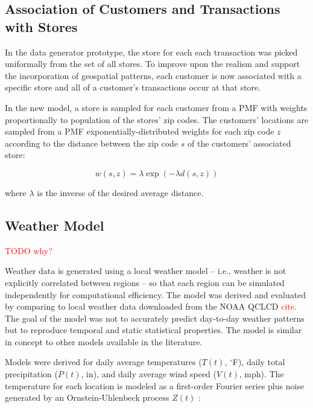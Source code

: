 \documentclass[conference]{IEEEtran}
\begin{document}

\subsection{Association of Customers and Transactions with Stores}
In the data generator prototype, the store for each each transaction was picked uniformally from the set of all stores.  To improve upon the realism and support the incorporation of geospatial patterns, each customer is now associated with a specific store and all of a customer's transactions occur at that store.

In the new model, a store is sampled for each customer from a PMF with weights proportionally to population of the stores' zip codes.  The customers' locations are sampled from a PMF exponentially-distributed weights for each zip code $z$ according to the distance between the zip code $s$ of the customers' associated store:

\begin{equation}
w(s, z) = \lambda \exp(-\lambda d(s, z))
\end{equation}

where $\lambda$ is the inverse of the desired average distance.

\subsection{Weather Model}

\textcolor{red}{TODO why?}

Weather data is generated using a local weather model -- i.e., weather is not explicitly correlated between regions -- so that each region can be simulated independently for computational efficiency.  The model was derived and evaluated by comparing to local weather data downloaded from the NOAA QCLCD \textcolor{red}{cite}.  The goal of the model was not to accurately predict day-to-day weather patterns but to reproduce temporal and static statistical properties.  The model is similar in concept to other models \cite{Racsko1991,Chen2010,Birt2010,Fatichi2011} available in the literature.

Models were derived for daily average temperatures ($T(t)$, $^\circ$F), daily total precipitation ($P(t)$, in), and daily average wind speed ($V(t)$, mph). The temperature for each location is modeled as a first-order Fourier series plus noise generated by an Ornstein-Uhlenbeck process $Z(t)$ \cite{Gardiner09}:
\end{document}
